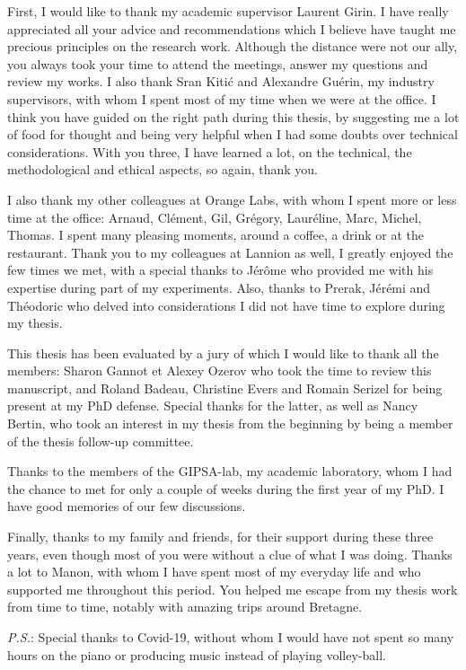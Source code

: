 \begin{acknowledgements}
\addchaptertocentry{\acknowledgementname}

First, I would like to thank my academic supervisor Laurent Girin. I have really appreciated all your advice and recommendations which I believe have taught me precious principles on the research work. Although the distance were not our ally, you always took your time to attend the meetings, answer my questions and review my works. I also thank Sr\dj{}an Kiti\'{c} and Alexandre Gu\'{e}rin, my industry supervisors, with whom I spent most of my time when we were at the office. I think you have guided on the right path during this thesis, by suggesting me a lot of food for thought and being very helpful when I had some doubts over technical considerations. With you three, I have learned a lot, on the technical, the methodological and ethical aspects, so again, thank you. 

I also thank my other colleagues at Orange Labs, with whom I spent more or less time at the office: Arnaud, Cl\'{e}ment, Gil, Gr\'{e}gory, Laur\'{e}line, Marc, Michel, Thomas. I spent many pleasing moments, around a coffee, a drink or at the restaurant. Thank you to my colleagues at Lannion as well, I greatly enjoyed the few times we met, with a special thanks to J\'{e}r\^{o}me who provided me with his expertise during part of my experiments. Also, thanks to Prerak, J\'{e}r\'{e}mi and Th\'{e}odoric who delved into considerations I did not have time to explore during my thesis.

This thesis has been evaluated by a jury of which I would like to thank all the members: Sharon Gannot et Alexey Ozerov who took the time to review this manuscript, and Roland Badeau, Christine Evers and Romain Serizel for being present at my PhD defense. Special thanks for the latter, as well as Nancy Bertin, who took an interest in my thesis from the beginning by being a member of the thesis follow-up committee.

Thanks to the members of the GIPSA-lab, my academic laboratory, whom I had the chance to met for only a couple of weeks during the first year of my PhD. I have good memories of our few discussions.

Finally, thanks to my family and friends, for their support during these three years, even though most of you were without a clue of what I was doing. Thanks a lot to Manon, with whom I have spent most of my everyday life and who supported me throughout this period. You helped me escape from my thesis work from time to time, notably with amazing trips around Bretagne.

\emph{P.S.}: Special thanks to Covid-19, without whom I would have not spent so many hours on the piano or producing music instead of playing volley-ball.

\end{acknowledgements}